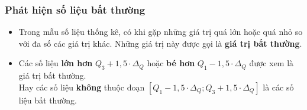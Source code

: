 \subsubsection{Phát hiện số liệu bất thường}
\begin{itemize}
	\item  Trong mẫu số liệu thống kê, có khi gặp những giá trị quá lớn 
	hoặc quá nhỏ so với đa số các giá trị khác. Những giá trị này được gọi 
	là \textbf{giá trị bất thường}.
	\item Các số liệu \textbf{lớn hơn} $Q_3+1{,}5 \cdot 
	\Delta_{Q}$ hoặc \textbf{bé hơn} $Q_1-1{,}5 \cdot 
	\Delta_{Q}$ được xem là giá trị bất thường.\\
	Hay các số liệu \textbf{không} thuộc đoạn $\left[Q_1-1{,}5 \cdot \Delta_{Q}; Q_3+1{,}5 \cdot \Delta_{Q} \right]$ là các số liệu bất thường.
\end{itemize}

